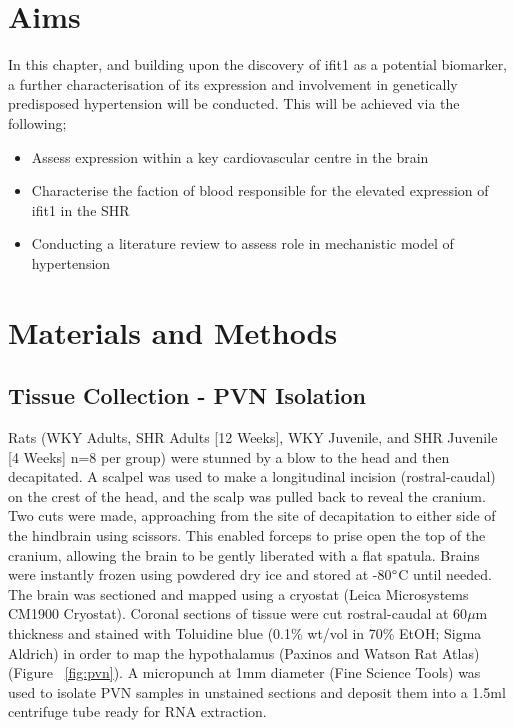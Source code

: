 \section{Aims}
In this chapter, and building upon the discovery of \acrshort{ifit1} as a potential biomarker, a further characterisation of its expression and involvement in genetically predisposed hypertension will be conducted. This will be achieved via the following;\\
\begin{itemize}
\singlespacing
\setlength
  \item Assess expression within a key cardiovascular centre in the brain \\
	\item Characterise the faction of blood responsible for the elevated expression of ifit1 in the SHR \\
	\item Conducting a literature review to assess role in mechanistic model of hypertension
\end{itemize}


\section{Materials and Methods}

\subsection{Tissue Collection - PVN Isolation}
Rats (WKY Adults, SHR Adults [12 Weeks], WKY Juvenile, and SHR Juvenile [4 Weeks] n=8 per group) were stunned by a blow to the head and then decapitated. A scalpel was used to make a longitudinal incision (rostral-caudal) on the crest of the head, and the scalp was pulled back to reveal the cranium. Two cuts were made, approaching from the site of decapitation to either side of the hindbrain using scissors. This enabled forceps to prise open the top of the cranium, allowing the brain to be gently liberated with a flat spatula. Brains were instantly frozen using powdered dry ice and stored at -80$\degree$C until needed. The brain was sectioned and mapped using a cryostat (Leica Microsystems CM1900 Cryostat). Coronal sections of tissue were cut rostral-caudal at 60$\mu$m thickness and stained with Toluidine blue (0.1\% wt/vol in 70\% EtOH; Sigma Aldrich) in order to map the hypothalamus (Paxinos and Watson Rat Atlas) (Figure ~\ref{fig:pvn}). A micropunch at 1mm diameter (Fine Science Tools) was used to isolate PVN samples in unstained sections and deposit them into a 1.5ml centrifuge tube ready for RNA extraction. \\
	

